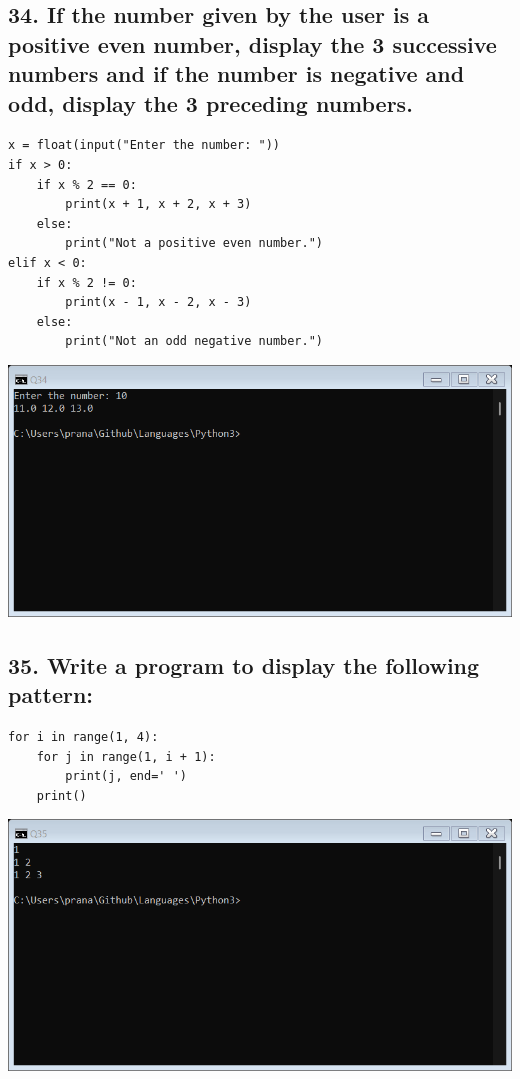 \documentclass[12pt]{article}
\begin{document}
\subsection*{34. If the number given by the user is a positive even number, display the 3 successive numbers and if the number is negative and odd, display the 3 preceding numbers.}
\begin{verbatim}
x = float(input("Enter the number: "))
if x > 0:
    if x % 2 == 0:
        print(x + 1, x + 2, x + 3)
    else:
        print("Not a positive even number.")
elif x < 0:
    if x % 2 != 0:
        print(x - 1, x - 2, x - 3)
    else:
        print("Not an odd negative number.")
\end{verbatim}
\includegraphics[width=\linewidth]{images/34.png}

\subsection*{35. Write a program to display the following pattern:}
\begin{verbatim}
for i in range(1, 4):
    for j in range(1, i + 1):
        print(j, end=' ')
    print()
\end{verbatim}
\includegraphics[width=\linewidth]{images/35.png}
\end{document}
